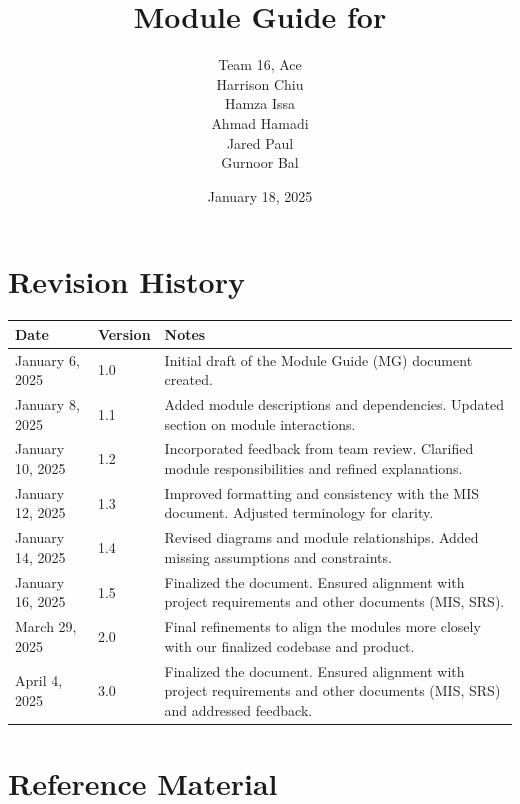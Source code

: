 \documentclass[12pt, titlepage]{article}
\begin{document}
\title{Module Guide for \progname} 
\author{Team 16, Ace\\
Harrison Chiu \\
Hamza Issa \\
Ahmad Hamadi \\
Jared Paul \\
Gurnoor Bal}
\date{January 18, 2025}

\maketitle


\section{Revision History}

\begin{tabularx}{\textwidth}{p{3cm}p{2cm}X}
\toprule
{\bf Date} & {\bf Version} & {\bf Notes}\\
\midrule
January 6, 2025 & 1.0 & Initial draft of the Module Guide (MG) document created.\\
January 8, 2025 & 1.1 & Added module descriptions and dependencies. Updated section on module interactions.\\
January 10, 2025 & 1.2 & Incorporated feedback from team review. Clarified module responsibilities and refined explanations.\\
January 12, 2025 & 1.3 & Improved formatting and consistency with the MIS document. Adjusted terminology for clarity.\\
January 14, 2025 & 1.4 & Revised diagrams and module relationships. Added missing assumptions and constraints.\\
January 16, 2025 & 1.5 & Finalized the document. Ensured alignment with project requirements and other documents (MIS, SRS).\\
March 29, 2025 & 2.0 & Final refinements to align the modules more closely with our finalized codebase and product.\\
April 4, 2025 & 3.0 & Finalized the document. Ensured alignment with project requirements and other documents (MIS, SRS) and addressed feedback.\\
\bottomrule
\end{tabularx}

\newpage

\section{Reference Material}
\end{document}
